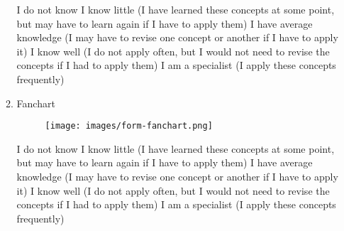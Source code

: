 \begin{enumerate}
\begin{enumerate}
        I do not know
       \newline {} I know little (I have learned these concepts at some point, but may have to learn again if I have to apply them)
       \newline {} I have average knowledge (I may have to revise one concept or another if I have to apply it)
       \newline {} I know well (I do not apply often, but I would not need to revise the concepts if I had to apply them)
       \newline {} I am a specialist (I apply these concepts frequently)\\

 \newpage
       \item Fanchart
       \begin{figure}[H]
 		\centering
 		\texttt{[image: images/form-fanchart.png]}
 		\label{fig:form-fanchart}
 	  \end{figure}
      
        I do not know
       \newline {} I know little (I have learned these concepts at some point, but may have to learn again if I have to apply them)
       \newline {} I have average knowledge (I may have to revise one concept or another if I have to apply it)
       \newline {} I know well (I do not apply often, but I would not need to revise the concepts if I had to apply them)
       \newline {} I am a specialist (I apply these concepts frequently)

     \end{enumerate}
\end{enumerate}